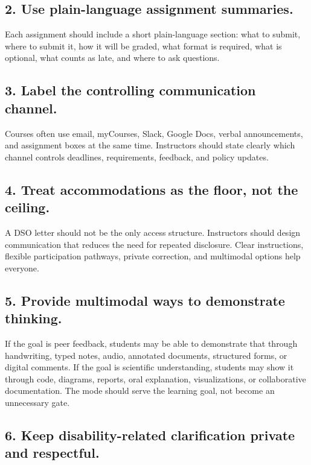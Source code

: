 \documentclass[12pt]{article}
\begin{document}
\subsection*{2. Use plain-language assignment summaries.}

Each assignment should include a short plain-language section: what to submit, where to submit it, how it will be graded, what format is required, what is optional, what counts as late, and where to ask questions.

\subsection*{3. Label the controlling communication channel.}

Courses often use email, myCourses, Slack, Google Docs, verbal announcements, and assignment boxes at the same time. Instructors should state clearly which channel controls deadlines, requirements, feedback, and policy updates.

\subsection*{4. Treat accommodations as the floor, not the ceiling.}

A DSO letter should not be the only access structure. Instructors should design communication that reduces the need for repeated disclosure. Clear instructions, flexible participation pathways, private correction, and multimodal options help everyone.

\subsection*{5. Provide multimodal ways to demonstrate thinking.}

If the goal is peer feedback, students may be able to demonstrate that through handwriting, typed notes, audio, annotated documents, structured forms, or digital comments. If the goal is scientific understanding, students may show it through code, diagrams, reports, oral explanation, visualizations, or collaborative documentation. The mode should serve the learning goal, not become an unnecessary gate.

\subsection*{6. Keep disability-related clarification private and respectful.}
\end{document}
